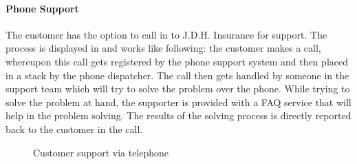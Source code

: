 \paragraph{Phone Support}
\label{sec:phone}
The customer has the option to call in to J.D.H. Insurance for support. The process is displayed in  and works like following: the customer makes a call, whereupon this call gets registered by the phone support system and then placed in a stack by the phone dispatcher. The call then gets handled by someone in the support team which will try to solve the problem over the phone. While trying to solve the problem at hand, the supporter is provided with a FAQ service that will help in the problem solving. The results of the solving process is directly reported back to the customer in the call. 
\begin{center}
	\begin{figure}[H]
		\centering
		\setlength\fboxsep{7pt}
		\setlength\fboxrule{0.5pt}
		\caption{Customer support via telephone}
		\label{fig:map_phone}
	\end{figure}
\end{center}
%
